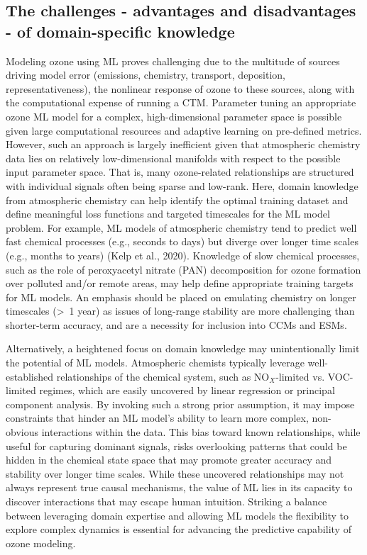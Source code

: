 \documentclass[gmd, manuscript]{copernicus}
\begin{document}
\subsection{The challenges - advantages and disadvantages - of domain-specific knowledge}
Modeling ozone using ML proves challenging due to the multitude of sources driving model error (emissions, chemistry, transport, deposition, representativeness), the nonlinear response of ozone to these sources, along with the computational expense of running a CTM. Parameter tuning an appropriate ozone ML model for a complex, high-dimensional parameter space is possible given large computational resources and adaptive learning on pre-defined metrics. However, such an approach is largely inefficient given that atmospheric chemistry data lies on relatively low-dimensional manifolds with respect to the possible input parameter space. That is, many ozone-related relationships are structured with individual signals often being sparse and low-rank. Here, domain knowledge from atmospheric chemistry can help identify the optimal training dataset and define meaningful loss functions and targeted timescales for the ML model problem. For example, ML models of atmospheric chemistry tend to predict well fast chemical processes (e.g., seconds to days) but diverge over longer time scales (e.g., months to years) (Kelp et al., 2020). Knowledge of slow chemical processes, such as the role of peroxyacetyl nitrate (PAN) decomposition for ozone formation over polluted and/or remote areas, may help define appropriate training targets for ML models. An emphasis should be placed on emulating chemistry on longer timescales (>~1 year) as issues of long-range stability are more challenging than shorter-term accuracy, and are a necessity for inclusion into CCMs and ESMs. 

Alternatively, a heightened focus on domain knowledge may unintentionally limit the potential of ML models. Atmospheric chemists typically leverage well-established relationships of the chemical system, such as NO$_X$-limited vs. VOC-limited regimes, which are easily uncovered by linear regression or principal component analysis. By invoking such a strong prior assumption, it may impose constraints that hinder an ML model's ability to learn more complex, non-obvious interactions within the data. This bias toward known relationships, while useful for capturing dominant signals, risks overlooking patterns that could be hidden in the chemical state space that may promote greater accuracy and stability over longer time scales. While these uncovered relationships may not always represent true causal mechanisms, the value of ML lies in its capacity to discover interactions that may escape human intuition. Striking a balance between leveraging domain expertise and allowing ML models the flexibility to explore complex dynamics is essential for advancing the predictive capability of ozone modeling.
\end{document}

